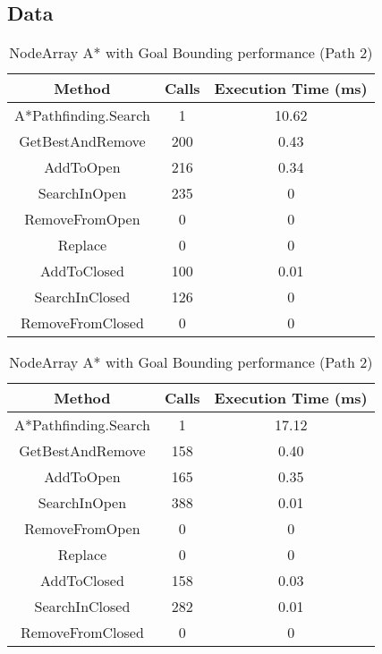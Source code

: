 \documentclass{article}
\begin{document}
  \subsection{Data}
  \begin{table}[h!]
    \parbox{.45\linewidth}{
      \centering
      \caption{NodeArray A* with Goal Bounding performance (Path 1)}
      \label{tab:tableGoalBounding1}
      \begin{tabular}{c|c|c}
        \textbf{Method} & \textbf{Calls} & \textbf{Execution Time (ms)}\\
        \hline
        A*Pathfinding.Search  & 1 & 10.62\\
        GetBestAndRemove & 200 & 0.43\\
        AddToOpen & 216 & 0.34\\
        SearchInOpen & 235 & 0\\
        RemoveFromOpen & 0 & 0\\
        Replace & 0 & 0\\
        AddToClosed & 100  & 0.01\\
        SearchInClosed & 126 & 0\\
        RemoveFromClosed & 0 & 0\\
      \end{tabular}
    }
    \hfil
    \parbox{.45\linewidth}{
      \centering
      \caption{NodeArray A* with Goal Bounding performance (Path 2)}
      \label{tab:tableGoalBounding2}
      \begin{tabular}{c|c|c}
        \textbf{Method} & \textbf{Calls} & \textbf{Execution Time (ms)}\\
        \hline
        A*Pathfinding.Search  & 1 & 17.12\\
        GetBestAndRemove & 158 & 0.40\\
        AddToOpen & 165 & 0.35\\
        SearchInOpen & 388 & 0.01\\
        RemoveFromOpen & 0 & 0\\
        Replace & 0 & 0\\
        AddToClosed & 158 & 0.03\\
        SearchInClosed & 282 & 0.01\\
        RemoveFromClosed & 0 & 0\\
      \end{tabular}
    }
  \end{table}
\end{document}
